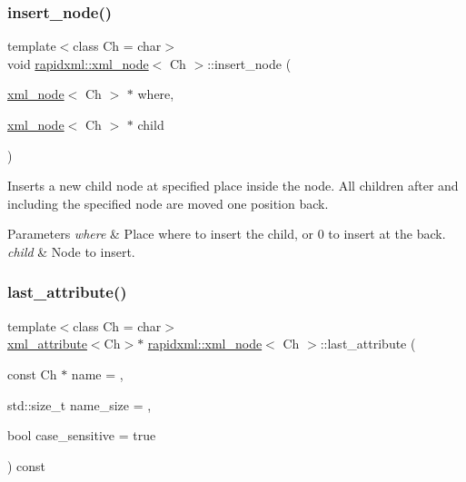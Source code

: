 \subsubsection{\texorpdfstring{insert\+\_\+node()}{insert\_node()}}
{\footnotesize\ttfamily template$<$class Ch = char$>$ \\
void \hyperlink{classrapidxml_1_1xml__node}{rapidxml\+::xml\+\_\+node}$<$ Ch $>$\+::insert\+\_\+node (\begin{DoxyParamCaption}\item[{\hyperlink{classrapidxml_1_1xml__node}{xml\+\_\+node}$<$ Ch $>$ $\ast$}]{where,  }\item[{\hyperlink{classrapidxml_1_1xml__node}{xml\+\_\+node}$<$ Ch $>$ $\ast$}]{child }\end{DoxyParamCaption})\hspace{0.3cm}{\ttfamily [inline]}}

Inserts a new child node at specified place inside the node. All children after and including the specified node are moved one position back. 
\begin{DoxyParams}{Parameters}
{\em where} & Place where to insert the child, or 0 to insert at the back. \\
\hline
{\em child} & Node to insert. \\
\hline
\end{DoxyParams}
\mbox{\label{classrapidxml_1_1xml__node_a67db03d1568dc6891573210ddba61520}} 
\subsubsection{\texorpdfstring{last\+\_\+attribute()}{last\_attribute()}}
{\footnotesize\ttfamily template$<$class Ch = char$>$ \\
\hyperlink{classrapidxml_1_1xml__attribute}{xml\+\_\+attribute}$<$Ch$>$$\ast$ \hyperlink{classrapidxml_1_1xml__node}{rapidxml\+::xml\+\_\+node}$<$ Ch $>$\+::last\+\_\+attribute (\begin{DoxyParamCaption}\item[{const Ch $\ast$}]{name = {},  }\item[{std\+::size\+\_\+t}]{name\+\_\+size = {},  }\item[{bool}]{case\+\_\+sensitive = {\ttfamily true} }\end{DoxyParamCaption}) const\hspace{0.3cm}{\ttfamily [inline]}}

